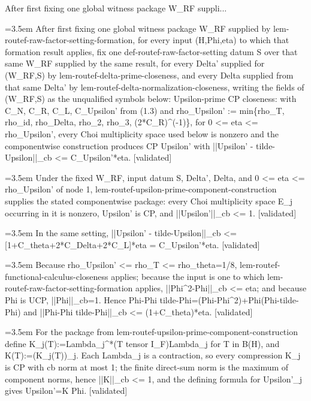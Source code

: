 \documentclass{article}
\newcommand{\step}[1]{\par\noindent\hangindent=3.5em\hangafter=1%
  \makebox[3.5em][l]{\textbf{#1.}}}
\newcommand{\steptag}[1]{\hfill{\small\textsf{[#1]}}}
\begin{document}
\begin{proofbox}{After first fixing one global witness package W\_RF suppli...}
\step{1} After first fixing one global witness package W\_RF supplied by lem-routef-raw-factor-setting-formation, for every input (H,Phi,eta) to which that formation result applies, fix one def-routef-raw-factor-setting datum S over that same W\_RF supplied by the same result, for every Delta' supplied for (W\_RF,S) by lem-routef-delta-prime-closeness, and every Delta supplied from that same Delta' by lem-routef-delta-normalization-closeness, writing the fields of (W\_RF,S) as the unqualified symbols below: Upsilon-prime CP closeness: with C\_N, C\_R, C\_L, C\_Upsilon' from (1.3) and rho\_Upsilon' := min\{rho\_T, rho\_id, rho\_Delta, rho\_2, rho\_3, (2*C\_R)\textasciicircum{}(-1)\}, for 0 <= eta <= rho\_Upsilon', every Choi multiplicity space used below is nonzero and the componentwise construction produces CP Upsilon' with ||Upsilon' - tilde-Upsilon||\_cb <= C\_Upsilon'*eta. \steptag{validated} \\[6pt]
\step{1.1} Under the fixed W\_RF, input datum S, Delta', Delta, and 0 <= eta <= rho\_Upsilon' of node 1, lem-routef-upsilon-prime-component-construction supplies the stated componentwise package: every Choi multiplicity space E\_j occurring in it is nonzero, Upsilon' is CP, and ||Upsilon'||\_cb <= 1. \steptag{validated} \\[4pt]
\step{1.2} In the same setting, ||Upsilon' - tilde-Upsilon||\_cb <= [1+C\_theta+2*C\_Delta+2*C\_L]*eta = C\_Upsilon'*eta. \steptag{validated} \\[6pt]
\step{1.2.1} Because rho\_Upsilon' <= rho\_T <= rho\_theta=1/8, lem-routef-functional-calculus-closeness applies; because the input is one to which lem-routef-raw-factor-setting-formation applies, ||Phi\textasciicircum{}2-Phi||\_cb <= eta; and because Phi is UCP, ||Phi||\_cb=1. Hence Phi-Phi tilde-Phi=(Phi-Phi\textasciicircum{}2)+Phi(Phi-tilde-Phi) and ||Phi-Phi tilde-Phi||\_cb <= (1+C\_theta)*eta. \steptag{validated} \\[4pt]
\step{1.2.2} For the package from lem-routef-upsilon-prime-component-construction define K\_j(T):=Lambda\_j\textasciicircum{}*(T tensor I\_F)Lambda\_j for T in B(H), and K(T):=(K\_j(T))\_j. Each Lambda\_j is a contraction, so every compression K\_j is CP with cb norm at most 1; the finite direct-sum norm is the maximum of component norms, hence ||K||\_cb <= 1, and the defining formula for Upsilon'\_j gives Upsilon'=K Phi. \steptag{validated} \\[4pt]

\end{proofbox}
\end{document}
